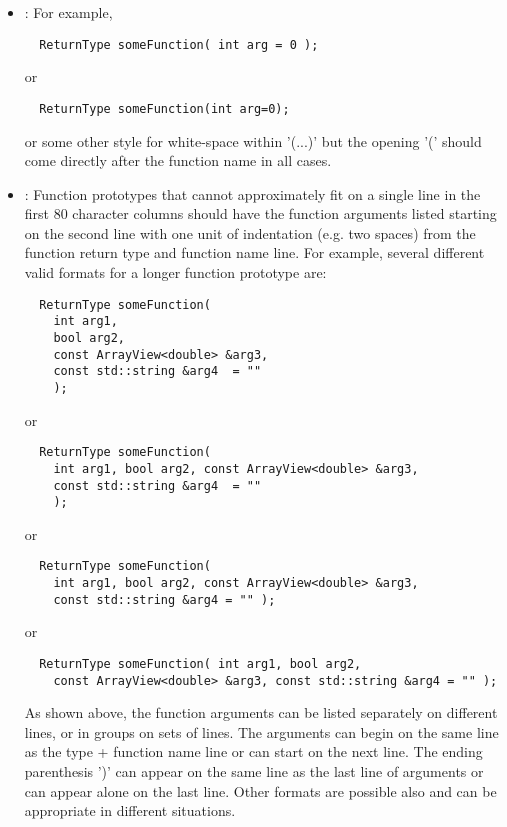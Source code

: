 \begin{itemize}
\begin{itemize}
  {}\item\FSCShortFunctionPrototypesOneLine: For example,

  {\small\begin{verbatim}
  ReturnType someFunction( int arg = 0 );
  \end{verbatim}}

  or 

  {\small\begin{verbatim}
  ReturnType someFunction(int arg=0);
  \end{verbatim}}

  or some other style for white-space within '(...)' but the opening '(' should
  come directly after the function name in all cases.

  {}\item\FSCLongFunctionPrototypesIndent: Function prototypes that cannot
  approximately fit on a single line in the first 80 character columns should
  have the function arguments listed starting on the second line with one unit
  of indentation (e.g. two spaces) from the function return type and function
  name line.  For example, several different valid formats for a longer
  function prototype are:

  {\small\begin{verbatim}
  ReturnType someFunction(
    int arg1,
    bool arg2,
    const ArrayView<double> &arg3,
    const std::string &arg4  = ""
    );
  \end{verbatim}}
  
  or
  
  {\small\begin{verbatim}
  ReturnType someFunction(
    int arg1, bool arg2, const ArrayView<double> &arg3,
    const std::string &arg4  = ""
    );
  \end{verbatim}}
  
  or
  
  {\small\begin{verbatim}
  ReturnType someFunction(
    int arg1, bool arg2, const ArrayView<double> &arg3,
    const std::string &arg4 = "" );
  \end{verbatim}}
  
  or
  
  {\small\begin{verbatim}
  ReturnType someFunction( int arg1, bool arg2,
    const ArrayView<double> &arg3, const std::string &arg4 = "" );
  \end{verbatim}}

  As shown above, the function arguments can be listed separately on different
  lines, or in groups on sets of lines.  The arguments can begin on the same
  line as the type + function name line or can start on the next line.  The
  ending parenthesis ')' can appear on the same line as the last line of
  arguments or can appear alone on the last line.  Other formats are possible
  also and can be appropriate in different situations.


\end{itemize}
\end{itemize}
